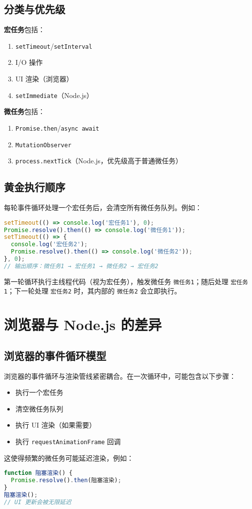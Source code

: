 \section{分类与优先级}
\textbf{宏任务}包括：\par
\begin{enumerate}
\item \verb!setTimeout!/\verb!setInterval!
\item I/O 操作
\item UI 渲染（浏览器）
\item \verb!setImmediate!（Node.js）
\end{enumerate}
\textbf{微任务}包括：\par
\begin{enumerate}
\item \verb!Promise.then!/\verb!async await!
\item \verb!MutationObserver!
\item \verb!process.nextTick!（Node.js，优先级高于普通微任务）
\end{enumerate}
\section{黄金执行顺序}
每轮事件循环处理一个宏任务后，会清空所有微任务队列。例如：\par
\begin{lstlisting}[language=javascript]
setTimeout(() => console.log('宏任务1'), 0);
Promise.resolve().then(() => console.log('微任务1'));
setTimeout(() => {
  console.log('宏任务2');
  Promise.resolve().then(() => console.log('微任务2'));
}, 0);
// 输出顺序：微任务1 → 宏任务1 → 微任务2 → 宏任务2
\end{lstlisting}
第一轮循环执行主线程代码（视为宏任务），触发微任务 \verb!微任务1!；随后处理 \verb!宏任务1!；下一轮处理 \verb!宏任务2! 时，其内部的 \verb!微任务2! 会立即执行。\par
\chapter{浏览器与 Node.js 的差异}
\section{浏览器的事件循环模型}
浏览器的事件循环与渲染管线紧密耦合。在一次循环中，可能包含以下步骤：\par
\begin{itemize}
\item 执行一个宏任务
\item 清空微任务队列
\item 执行 UI 渲染（如果需要）
\item 执行 \verb!requestAnimationFrame! 回调
\end{itemize}
这使得频繁的微任务可能延迟渲染，例如：\par
\begin{lstlisting}[language=javascript]
function 阻塞渲染() {
  Promise.resolve().then(阻塞渲染);
}
阻塞渲染();
// UI 更新会被无限延迟
\end{lstlisting}
